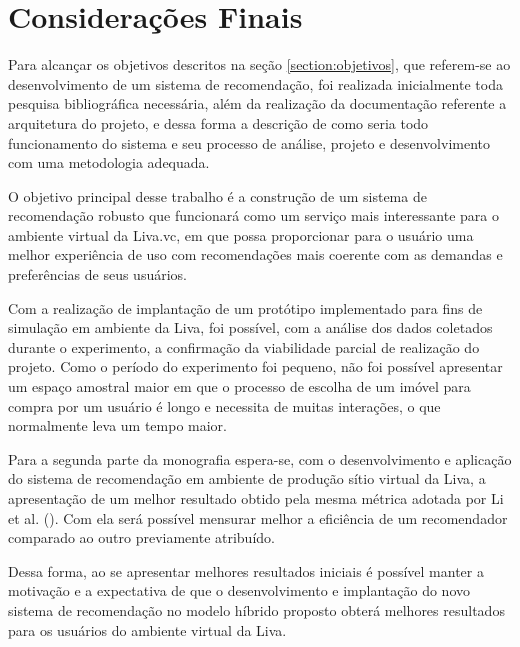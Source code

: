 \chapter{Considerações Finais}

Para alcançar os objetivos descritos na seção \ref{section:objetivos}, que referem-se ao desenvolvimento de um sistema de recomendação, foi realizada inicialmente toda pesquisa bibliográfica necessária, além da realização da documentação referente a arquitetura do projeto, e dessa forma a descrição de como seria todo funcionamento do sistema e seu processo de análise, projeto e desenvolvimento com uma metodologia adequada.

O objetivo principal desse trabalho é a construção de um sistema de recomendação robusto que funcionará como um serviço mais interessante para o ambiente virtual da Liva.vc, em que possa proporcionar para o usuário uma melhor experiência de uso com recomendações mais coerente com as demandas e preferências de seus usuários.

Com a realização de implantação de um protótipo implementado para fins de simulação em ambiente da Liva, foi possível, com a análise dos dados coletados durante o experimento, a confirmação da viabilidade parcial de realização do projeto. Como o período do experimento foi pequeno, não foi possível apresentar um espaço amostral maior em que o processo de escolha de um imóvel para compra por um usuário é longo e necessita de muitas interações, o que normalmente leva um tempo maior.

Para a segunda parte da monografia espera-se, com o desenvolvimento e aplicação do sistema de recomendação em ambiente de produção sítio virtual da Liva, a apresentação de um melhor resultado obtido pela mesma métrica adotada por Li et al. (\citeyear{Summo:2017}). Com ela será possível mensurar melhor a eficiência de um recomendador comparado ao outro previamente atribuído.

Dessa forma, ao se apresentar melhores resultados iniciais é possível manter a motivação e a expectativa de que o desenvolvimento e implantação do novo sistema de recomendação no modelo híbrido proposto obterá melhores resultados para os usuários do ambiente virtual da Liva.



